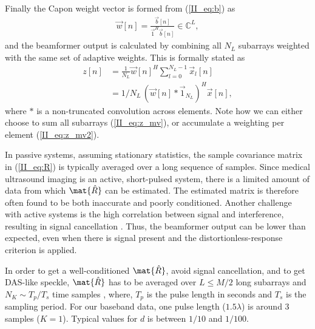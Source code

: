 Finally the Capon weight vector is formed from (\ref{II_eq:b}) as
%
\begin{align}\label{II_eq:w}
\vec{w}[n] = \frac{\vec{b}[n]}{\vec{1}^H\vec{b}[n]} \in \mathbb{C}^L,
\end{align}
%
and the beamformer output is calculated by combining all $N_L$ subarrays weighted with the same set of adaptive weights. This is formally stated as
%
\begin{align}
z[n] &= \frac{1}{N_L}\vec{w}[n]^H \sum_{l=0}^{N_L-1} \vec{x}_l[n] \label{II_eq:z_mv}\\
&= 1/N_L \, (\vec{w}[n] * \vec{1}_{N_L})^H\vec{x}[n] \label{II_eq:z_mv2},
\end{align}
where $*$ is a non-truncated convolution across elements.
Note how we can either choose to sum all subarrays (\ref{II_eq:z_mv}), or accumulate a weighting per element (\ref{II_eq:z_mv2}).

In passive systems, assuming stationary statistics, the sample covariance matrix in (\ref{II_eq:R}) is typically averaged over a long sequence of samples\cite{Krima}. Since medical ultrasound imaging is an active, short-pulsed system, there is a limited amount of data from which $\mat{\hat{R}}$ can be estimated. The estimated matrix is therefore often found to be both inaccurate and poorly conditioned. Another challenge with active systems is the high correlation between signal and interference, resulting in signal cancellation \cite{Reddy1987}. Thus, the beamformer output can be lower than expected, even when there is signal present and the distortionless-response criterion is applied. 

In order to get a well-conditioned $\mat{\hat{R}}$, avoid signal cancellation, and to get DAS-like speckle, $\mat{\hat{R}}$ has to be averaged over $L\le M/2$ long subarrays and $N_K \sim T_p/T_s$ time samples \cite{Synnevag2007a}, where, $T_p$ is the pulse length in seconds and $T_s$ is the sampling period. For our baseband data, one pulse length ($1.5\lambda$) is around 3 samples ($K=1$). Typical values for $d$ is between $1/10$ and $1/100$.

